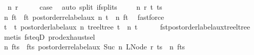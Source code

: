\begin{isabellebody}
\isamarkupfalse%
\ {\isacharparenleft}{\kern0pt}{}\ n\ r{\isacharparenright}{\kern0pt}\isanewline
\ \ \isamarkupfalse%
\ \isamarkupfalse%
\ {\isacharquery}{\kern0pt}case\ \isamarkupfalse%
\ {\isacharparenleft}{\kern0pt}auto\ split{\isacharcolon}{\kern0pt}\ if{\isacharunderscore}{\kern0pt}splits{\isacharparenright}{\kern0pt}\isanewline
{}\isamarkupfalse%
\isanewline
\ \ \isamarkupfalse%
\ {\isacharparenleft}{\kern0pt}{}\ n\ r\ t\ ts{\isacharparenright}{\kern0pt}\isanewline
\ \ \isamarkupfalse%
\ n{\isacharprime}{\kern0pt}\ f{\isacharunderscore}{\kern0pt}t\ \ f{\isacharunderscore}{\kern0pt}t{\isacharcolon}{\kern0pt}\ {\isachardoublequoteopen}postorder{\isacharunderscore}{\kern0pt}relabel{\isacharunderscore}{\kern0pt}aux\ n\ t\ {\isacharequal}{\kern0pt}\ {\isacharparenleft}{\kern0pt}n{\isacharprime}{\kern0pt}{\isacharcomma}{\kern0pt}\ f{\isacharunderscore}{\kern0pt}t{\isacharparenright}{\kern0pt}{\isachardoublequoteclose}\ \isamarkupfalse%
\ fastforce\isanewline
\ \ \isamarkupfalse%
\ \isamarkupfalse%
\ t{\isacharprime}{\kern0pt}\ \ t{\isacharprime}{\kern0pt}{\isacharcolon}{\kern0pt}\ {\isachardoublequoteopen}postorder{\isacharunderscore}{\kern0pt}label{\isacharunderscore}{\kern0pt}aux\ n\ {\isacharparenleft}{\kern0pt}tree{\isacharunderscore}{\kern0pt}ltree\ t{\isacharparenright}{\kern0pt}\ {\isacharequal}{\kern0pt}\ {\isacharparenleft}{\kern0pt}n{\isacharprime}{\kern0pt}{\isacharcomma}{\kern0pt}\ t{\isacharprime}{\kern0pt}{\isacharparenright}{\kern0pt}{\isachardoublequoteclose}\isanewline
\ \ \ \ \isamarkupfalse%
\ fst{\isacharunderscore}{\kern0pt}postorder{\isacharunderscore}{\kern0pt}label{\isacharunderscore}{\kern0pt}aux{\isacharunderscore}{\kern0pt}tree{\isacharunderscore}{\kern0pt}ltree\ \isamarkupfalse%
\ {\isacharparenleft}{\kern0pt}metis\ fst{\isacharunderscore}{\kern0pt}eqD\ prod{\isachardot}{\kern0pt}exhaust{\isacharunderscore}{\kern0pt}sel{\isacharparenright}{\kern0pt}\isanewline
\ \ \isamarkupfalse%
\ n{\isacharprime}{\kern0pt}{\isacharprime}{\kern0pt}\ f{\isacharunderscore}{\kern0pt}ts\ \ f{\isacharunderscore}{\kern0pt}ts{\isacharcolon}{\kern0pt}\ {\isachardoublequoteopen}postorder{\isacharunderscore}{\kern0pt}relabel{\isacharunderscore}{\kern0pt}aux\ {\isacharparenleft}{\kern0pt}Suc\ n{\isacharprime}{\kern0pt}{\isacharparenright}{\kern0pt}\ {\isacharparenleft}{\kern0pt}LNode\ r\ ts{\isacharparenright}{\kern0pt}\ {\isacharequal}{\kern0pt}\ {\isacharparenleft}{\kern0pt}n{\isacharprime}{\kern0pt}{\isacharprime}{\kern0pt}{\isacharcomma}{\kern0pt}\ f{\isacharunderscore}{\kern0pt}ts{\isacharparenright}{\kern0pt}{\isachardoublequoteclose}\ \isamarkupfalse%

\end{isabellebody}
